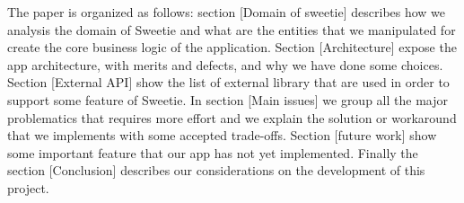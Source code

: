 The paper is organized as follows: section [Domain of sweetie] describes how we analysis the domain of Sweetie and what are the entities that we manipulated for create the core business logic of the application. Section [Architecture] expose the app architecture, with merits and defects, and why we have done some choices. Section [External API] show the list of external library that are used in order to support some feature of Sweetie. In section [Main issues] we group all the major problematics that requires more effort and we explain the solution or workaround that we implements with some accepted trade-offs. Section [future work] show some important feature that our app has not yet implemented. Finally the section [Conclusion] describes our considerations on the development of this project.
